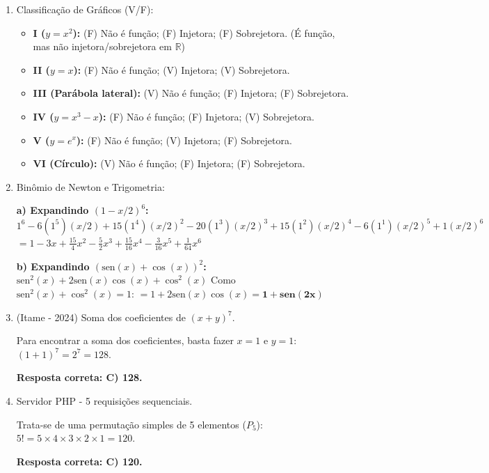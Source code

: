 \documentclass[12pt,a4paper]{article}
\begin{document}
\begin{enumerate}
    \item Classificação de Gráficos (V/F):
    \begin{respostabox}
    \begin{itemize}
        \item \textbf{I ($y=x^2$):} (F) Não é função; (F) Injetora; (F) Sobrejetora. (É função, mas não injetora/sobrejetora em $\mathbb{R}$)
        \item \textbf{II ($y=x$):} (F) Não é função; (V) Injetora; (V) Sobrejetora.
        \item \textbf{III (Parábola lateral):} (V) Não é função; (F) Injetora; (F) Sobrejetora.
        \item \textbf{IV ($y=x^3-x$):} (F) Não é função; (F) Injetora; (V) Sobrejetora.
        \item \textbf{V ($y=e^x$):} (F) Não é função; (V) Injetora; (F) Sobrejetora.
        \item \textbf{VI (Círculo):} (V) Não é função; (F) Injetora; (F) Sobrejetora.
    \end{itemize}
    \end{respostabox}

    \item Binômio de Newton e Trigometria:
    \begin{respostabox}
    \textbf{a) Expandindo $(1 - x/2)^6$:}
    $1^6 - 6(1^5)(x/2) + 15(1^4)(x/2)^2 - 20(1^3)(x/2)^3 + 15(1^2)(x/2)^4 - 6(1^1)(x/2)^5 + 1(x/2)^6$
    $= 1 - 3x + \frac{15}{4}x^2 - \frac{5}{2}x^3 + \frac{15}{16}x^4 - \frac{3}{16}x^5 + \frac{1}{64}x^6$
    
    \textbf{b) Expandindo $(\text{sen}(x) + \cos(x))^2$:}
    $\text{sen}^2(x) + 2\text{sen}(x)\cos(x) + \cos^2(x)$
    Como $\text{sen}^2(x) + \cos^2(x) = 1$:
    $= 1 + 2\text{sen}(x)\cos(x) = \mathbf{1 + \text{sen}(2x)}$
    \end{respostabox}

    \item (Itame - 2024) Soma dos coeficientes de $(x+y)^7$.
    \begin{respostabox}
    Para encontrar a soma dos coeficientes, basta fazer $x=1$ e $y=1$:
    $(1 + 1)^7 = 2^7 = 128$.
    
    \textbf{Resposta correta: C) 128.}
    \end{respostabox}

    \item Servidor PHP - 5 requisições sequenciais.
    \begin{respostabox}
    Trata-se de uma permutação simples de 5 elementos ($P_5$):
    $5! = 5 \times 4 \times 3 \times 2 \times 1 = 120$.
    
    \textbf{Resposta correta: C) 120.}
    \end{respostabox}
\end{enumerate}
\end{document}
